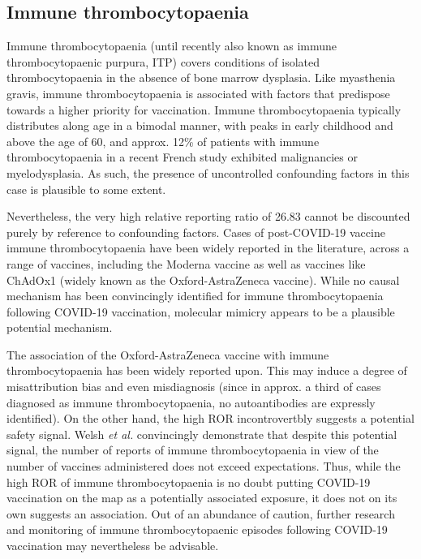 \documentclass{article}
\begin{document}
\subsection{Immune thrombocytopaenia}\label{subsec:immune-thrombocytopaenia}

Immune thrombocytopaenia (until recently also known as immune thrombocytopaenic purpura, ITP) covers conditions of isolated thrombocytopaenia in the absence of bone marrow dysplasia.\cite{kistangari2013immune}
Like myasthenia gravis, immune thrombocytopaenia is associated with factors that predispose towards a higher priority for vaccination.
Immune thrombocytopaenia typically distributes along age in a bimodal manner, with peaks in early childhood and above the age of 60, and approx. 12\% of patients with immune thrombocytopaenia in a recent French study exhibited malignancies or myelodysplasia.\cite{moulis2014epidemiology}
As such, the presence of uncontrolled confounding factors in this case is plausible to some extent.

Nevertheless, the very high relative reporting ratio of 26.83 cannot be discounted purely by reference to confounding factors.
Cases of post-COVID-19 vaccine immune thrombocytopaenia have been widely reported in the literature,\cite{xie2021covid,tarawneh2021immune,tiede2021prothrombotic,pai2021vaccine} across a range of vaccines, including the Moderna vaccine as well as vaccines like ChAdOx1 (widely known as the Oxford-AstraZeneca vaccine).
While no causal mechanism has been convincingly identified for immune thrombocytopaenia following COVID-19 vaccination, molecular mimicry appears to be a plausible potential mechanism.\cite{saudagar2021vigilance}

The association of the Oxford-AstraZeneca vaccine with immune thrombocytopaenia has been widely reported upon.\cite{pishko2021covid}
This may induce a degree of misattribution bias and even misdiagnosis (since in approx. a third of cases diagnosed as immune thrombocytopaenia, no autoantibodies are expressly identified).
On the other hand, the high ROR incontrovertbly suggests a potential safety signal.
Welsh \textit{et al.} convincingly demonstrate that despite this potential signal, the number of reports of immune thrombocytopaenia in view of the number of vaccines administered does not exceed expectations.\cite{WELSH20213329}
Thus, while the high ROR of immune thrombocytopaenia is no doubt putting COVID-19 vaccination on the map as a potentially associated exposure, it does not on its own suggests an association.
Out of an abundance of caution, further research and monitoring of immune thrombocytopaenic episodes following COVID-19 vaccination may nevertheless be advisable.
\end{document}
